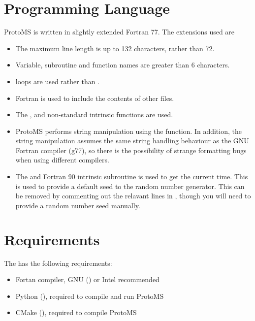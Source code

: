 \documentclass[letterpaper,10pt,english]{sphinxmanual}
\begin{document}
\section{Programming Language}
\label{\detokenize{compilation:programming-language}}\label{\detokenize{compilation:fortran77}}
ProtoMS is written in slightly extended Fortran 77. The extensions used are
\begin{itemize}
\item {} 
The maximum line length is up to 132 characters, rather than 72.

\item {} 
Variable, subroutine and function names are greater than 6 characters.

\item {} 
 loops are used rather than .

\item {} 
Fortran  is used to include the contents of other files.

\item {} 
The ,  and  non-standard intrinsic functions are used.

\item {} 
ProtoMS performs string manipulation using the  function. In addition, the string manipulation assumes the same string handling behaviour as the GNU Fortran compiler (g77), so there is the possibility of strange formatting bugs when using different compilers.

\item {} 
The  and  Fortran 90 intrinsic subroutine is used to get the current time. This is used to provide a default seed to the random number generator. This can be removed by commenting out the relavant lines in , though you will need to provide a random number seed manually.

\end{itemize}


\section{Requirements}
\label{\detokenize{compilation:requirements}}
The  has the following requirements:
\begin{itemize}
\item {} 
Fortan compiler, GNU () or Intel recommended

\item {} 
Python (), required to compile and run ProtoMS

\item {} 
CMake (), required to compile ProtoMS

\end{itemize}
\end{document}

